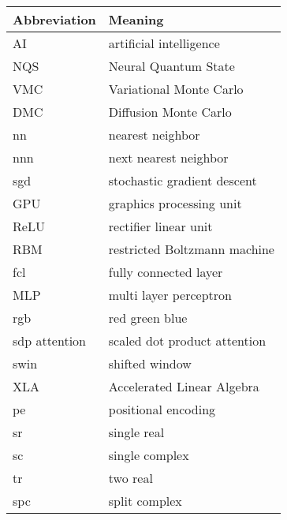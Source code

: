 \noindent\\\\

\begin{tabular}[h]{p{3cm}|l}
	Abbreviation & Meaning\\
	\hline
	AI & artificial intelligence\\ 
	NQS & Neural Quantum State\\
	VMC & Variational Monte Carlo\\
	DMC & Diffusion Monte Carlo\\
	nn & nearest neighbor\\
	nnn & next nearest neighbor\\
	sgd & stochastic gradient descent\\
	GPU & graphics processing unit\\
	ReLU & rectifier linear unit\\
	RBM & restricted Boltzmann machine\\
	fcl & fully connected layer\\
	MLP & multi layer perceptron\\
	rgb & red green blue\\
	sdp attention & scaled dot product attention\\
	swin & shifted window\\
	XLA & Accelerated Linear Algebra\\
	pe & positional encoding\\
	sr & single real\\
	sc & single complex\\
	tr & two real\\
	spc & split complex\\
\end{tabular}
\newpage